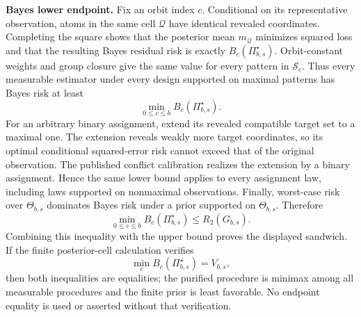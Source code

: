 \textbf{Bayes lower endpoint.}
Fix an orbit index \(c\).  Conditional on its representative observation, atoms in the same cell \(\mathcal Q\) have identical revealed coordinates.  Completing the square shows that the posterior mean \(m_{\mathcal Q}\) minimizes squared loss and that the resulting Bayes residual risk is exactly \(B_c(\Pi_{b,s}^{\star})\).  Orbit-constant weights and group closure give the same value for every pattern in \(\mathcal S_c\).  Thus every measurable estimator under every design supported on maximal patterns has Bayes risk at least
\[
\min_{0\leq c\leq b}B_c(\Pi_{b,s}^{\star}).
\]
For an arbitrary binary assignment, extend its revealed compatible target set to a maximal one.  The extension reveals weakly more target coordinates, so its optimal conditional squared-error risk cannot exceed that of the original observation.  The published conflict calibration realizes the extension by a binary assignment.  Hence the same lower bound applies to every assignment law, including laws supported on nonmaximal observations.  Finally, worst-case risk over \(\Theta_{b,s}\) dominates Bayes risk under a prior supported on \(\Theta_{b,s}\).  Therefore
\[
\min_{0\leq c\leq b}B_c(\Pi_{b,s}^{\star})
\leq R_2(G_{b,s}).
\]
Combining this inequality with the upper bound proves the displayed sandwich.  If the finite posterior-cell calculation verifies
\[
\min_cB_c(\Pi_{b,s}^{\star})=V_{b,s},
\]
then both inequalities are equalities; the purified procedure is minimax among all measurable procedures and the finite prior is least favorable.  No endpoint equality is used or asserted without that verification.